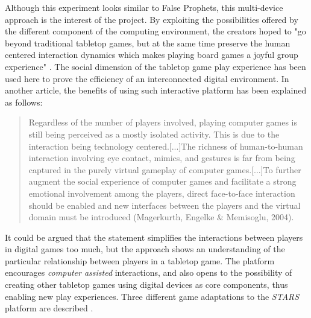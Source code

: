 Although this experiment looks similar to False Prophets, this multi-device approach is the interest of the project. By exploiting the possibilities offered by the different component of the computing environment, the creators hoped to "go beyond traditional tabletop games, but at the same time preserve the human centered interaction dynamics which makes playing board games a joyful group experience" \cite{art:stars}. The social dimension of the tabletop game play experience has been used here to prove the efficiency of an interconnected digital environment. In another article, the benefits of using such interactive platform has been explained as follows:

\begin{quotation}
Regardless of the number of players involved, playing computer games is still being perceived as a mostly isolated activity. This is due to the interaction being technology centered.[...]The richness of human-to-human interaction
involving eye contact, mimics, and gestures is far from being captured in the purely virtual gameplay of computer games.[...]To further augment the social experience of computer games and facilitate a strong emotional involvement among the players, direct face-to-face interaction should be enabled and new interfaces between the players and the virtual domain must be introduced (Magerkurth, Engelke \& Memisoglu, 2004)\cite{art:stars2}.
\end{quotation}

It could be argued that the statement simplifies the interactions between players in digital games too much, but the approach shows an understanding of the particular relationship between players in a tabletop game. The platform encourages \textit{computer assisted} interactions, and also opens to the possibility of creating other tabletop games using digital devices as core components, thus enabling new play experiences. Three different game adaptations to the \textit{STARS} platform are described \cite{art:stars2}.

